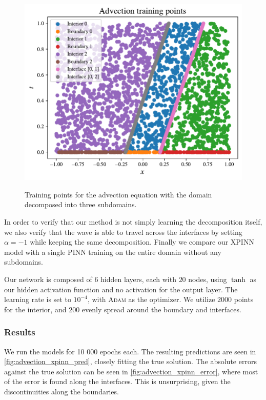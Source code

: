 \begin{figure}[h]
    \centering
    \includegraphics[width=0.8\linewidth]{Project1XPINNs/figures/advection/advection_train.pdf}
    \label{subfig:single}
    \caption{Training points for the advection equation with the domain decomposed into three subdomains.}
    \label{fig:decomp_advection}
\end{figure}

In order to verify that our method is not simply learning the decomposition itself, we also verify that the wave is able to travel across the interfaces by setting $\alpha = -1$ while keeping the same decomposition.
Finally we compare our XPINN model with a single PINN training on the entire domain without any subdomains. 

Our network is composed of $6$ hidden layers, each with $20$ nodes, using $\tanh$ as our hidden activation function and no activation for the output layer. The learning rate is set to $10^{-4}$, with \textsc{Adam} as the optimizer.
We utilize $2000$ points for the interior, and $200$ evenly spread around the boundary and interfaces. 

\subsubsection{Results}
We run the models for 10 000 epochs each.
The resulting predictions are seen in \autoref{fig:advection_xpinn_pred}, closely fitting the true solution.
The absolute errors against the true solution can be seen in \autoref{fig:advection_xpinn_error}, where most of the error is found along the interfaces.
This is unsurprising, given the discontinuities along the boundaries.


